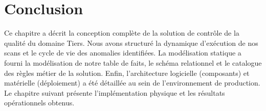 \vspace{0.4cm}

\section*{Conclusion}
Ce chapitre a décrit la conception complète de la solution de contrôle de la qualité du domaine Tiers. Nous avons structuré la dynamique d'exécution de nos scans et le cycle de vie des anomalies identifiées. La modélisation statique a fourni la modélisation de notre table de faits, le schéma relationnel et le catalogue des règles métier de la solution. Enfin, l'architecture logicielle (composants) et matérielle (déploiement) a été détaillée au sein de l'environnement de production. Le chapitre suivant présente l'implémentation physique et les résultats opérationnels obtenus.
